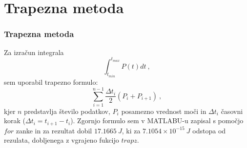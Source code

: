 \documentclass{beamer}
\begin{document}
\section{Trapezna metoda}
\begin{frame}[fragile]
\frametitle{Trapezna metoda}
Za izračun integrala $$\int_{t_{min}}^{t_{max}} P(t)dt\ ,$$sem uporabil trapezno formulo:
$$\sum_{i=1}^{n-1} \frac{\Delta t_i}{2} (P_i + P_{i+1})\ ,$$
kjer $n$ predstavlja število podatkov, $P_i$ posamezno vrednost moči in $\Delta t_i$ časovni korak ($\Delta t_i = t_{i+1} - t_i$). 
Zgornjo formulo sem v MATLABU-u zapisal s pomočjo $for$ zanke in za rezultat dobil $17.1665\ J$, ki za $7.1054\times 10^{-15}\ J$ odstopa od rezulata, dobljenega z vgrajeno fukcijo $trapz$.
\end{frame}
\end{document}
